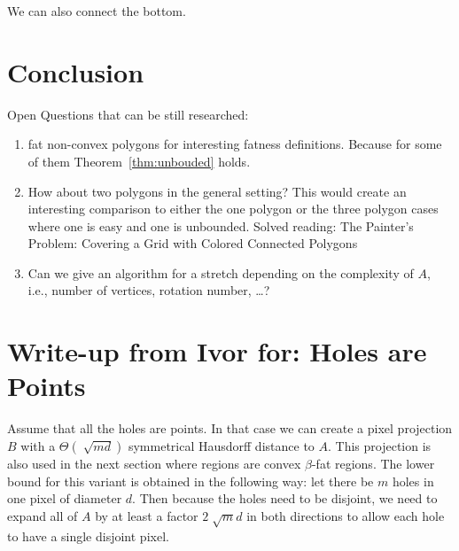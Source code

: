 \documentclass{paper}
\begin{document}
{%
We can also connect the bottom.






\section{Conclusion} %
\label{sec:conclusion}

Open Questions that can be still researched:
\begin{enumerate}
	\item fat non-convex polygons for interesting fatness definitions. Because for some of them Theorem~\ref{thm:unbouded} holds.
	\item How about two polygons in the general setting? This would create an interesting comparison to either the one polygon or the three polygon cases where one is easy and one is unbounded.
	Solved reading: The Painter’s Problem: Covering a Grid with Colored Connected Polygons
	\item Can we give an algorithm for a stretch depending on the complexity of $A$, i.e., number of vertices, rotation number, \dots?
\end{enumerate}


\newpage
\appendix



\section{Write-up from Ivor for: Holes are Points}



Assume that all the holes are points. In that case we can create a pixel projection $B$ with a $\Theta(\sqrt[]{md})$ symmetrical Hausdorff distance to $A$. This projection is also used in the next section where regions are convex $\beta$-fat regions.  The lower bound for this variant is obtained in the following way: let there be $m$ holes in one pixel of diameter $d$. Then because the holes need to be disjoint, we need to expand all of $A$ by at least a factor $2\sqrt[]{m}d$ in both directions to allow each hole to have a single disjoint pixel.

}
\end{document}
